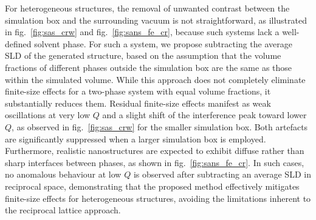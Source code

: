 \documentclass[preprint, 5p, times, twocolumn]{elsarticle}
\begin{document}

For heterogeneous structures, the removal of unwanted contrast between the simulation box and the surrounding vacuum is not straightforward, as illustrated in fig.~\ref{fig:sas_crw} and fig.~\ref{fig:sans_fe_cr}, because such systems lack a well-defined solvent phase. For such a system, we propose subtracting the average SLD of the generated structure, based on the assumption that the volume fractions of different phases outside the simulation box are the same as those within the simulated volume. While this approach does not completely eliminate finite-size effects for a two-phase system with equal volume fractions, it substantially reduces them. Residual finite-size effects manifest as weak oscillations at very low $Q$ and a slight shift of the interference peak toward lower $Q$, as observed in fig.~\ref{fig:sas_crw} for the smaller simulation box. Both artefacts are significantly suppressed when a larger simulation box is employed. Furthermore, realistic nanostructures are expected to exhibit diffuse rather than sharp interfaces between phases, as shown in fig.~\ref{fig:sans_fe_cr}. In such cases, no anomalous behaviour at low $Q$ is observed after subtracting an average SLD in reciprocal space, demonstrating that the proposed method effectively mitigates finite-size effects for heterogeneous structures, avoiding the limitations inherent to the reciprocal lattice approach.
\end{document}
